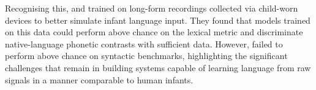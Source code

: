 Recognising this, \citet{lavechin} and \citet{lavechin2024modeling} trained \stela on long-form recordings collected via child-worn devices to better simulate infant language input. They found that models trained on this data could perform above chance on the \babyslm lexical metric and discriminate native-language phonetic contrasts with sufficient data. However, \stela failed to perform above chance on syntactic benchmarks, highlighting the significant challenges that remain in building systems capable of learning language from raw signals in a manner comparable to human infants.


